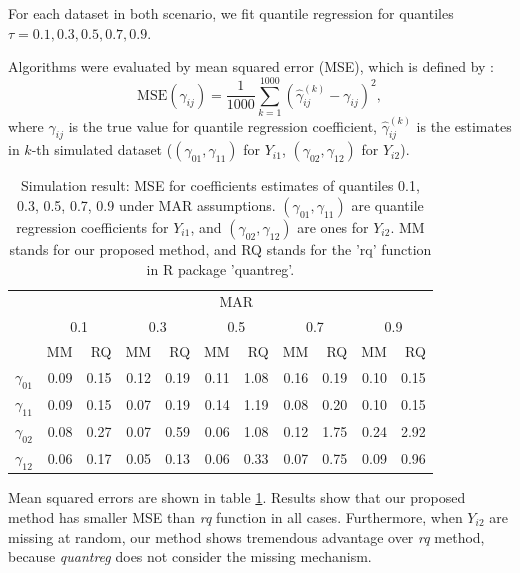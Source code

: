 \documentclass[12pt]{article}
\begin{document}
For each dataset in both scenario, we fit quantile regression for
quantiles $\tau = 0.1, 0.3, 0.5, 0.7, 0.9$.

Algorithms were evaluated by mean squared error (MSE), which is
defined by :
\begin{equation*}
  \text{MSE} (\gamma_{ij}) = \frac{1}{1000} \sum_{k = 1}^{1000} \left( \hat{\gamma}_{ij}^{(k)}  - \gamma_{ij}\right)^2,
\end{equation*}
where $\gamma_{ij}$ is the true value for quantile regression coefficient,
$\hat{\gamma}_{ij}^{(k)}$ is the estimates in $k$-th simulated dataset
($(\gamma_{01}, \gamma_{11})$ for $Y_{i1}$, $(\gamma_{02},
\gamma_{12})$ for $Y_{i2}$).

\begin{table}[ht]
  \renewcommand{\arraystretch}{1.3}
  \centering
  \caption{Simulation result: MSE for coefficients estimates of quantiles
    0.1, 0.3, 0.5, 0.7, 0.9 under MAR assumptions. $(\gamma_{01}, \gamma_{11})$ 
    are quantile regression coefficients for $Y_{i1}$, and $(\gamma_{02}, \gamma_{12})$ 
    are ones for $Y_{i2}$. MM stands for our proposed method, and RQ stands for the 'rq'     function in R package 'quantreg'.}\label{tab:simh2} 
  \vspace{10pt}
  \begin{tabular}{rrrrrrrrrrr}
    \toprule
    & \multicolumn{ 10}{c}{MAR} \\
    \cline{2-11}
    &  \multicolumn{2}{c}{0.1} &  \multicolumn{2}{c}{0.3} &  \multicolumn{2}{c}{0.5} &  \multicolumn{2}{c}{0.7} &  \multicolumn{2}{c}{0.9} \\
    \cline{2-11}
    & MM & RQ    & MM & RQ    & MM & RQ    & MM & RQ    & MM & RQ \\
    \hline
    $\gamma_{01}$ & 0.09 & 0.15 & 0.12 & 0.19 & 0.11 & 1.08 & 0.16 & 0.19 & 0.10 & 0.15 \\ 
    $\gamma_{11}$ & 0.09 & 0.15 & 0.07 & 0.19 & 0.14 & 1.19 & 0.08 & 0.20 & 0.10 & 0.15 \\ 
    $\gamma_{02}$ & 0.08 & 0.27 & 0.07 & 0.59 & 0.06 & 1.08 & 0.12 & 1.75 & 0.24 & 2.92 \\ 
    $\gamma_{12}$ & 0.06 & 0.17 & 0.05 & 0.13 & 0.06 & 0.33 & 0.07 & 0.75 & 0.09 & 0.96 \\ 
    \bottomrule
  \end{tabular}
\end{table}

Mean squared errors are shown in table \ref{tab:simh2}. Results show
that our proposed method has smaller MSE than \textit{rq} function in
all cases. Furthermore, when $Y_{i2}$ are missing at random, our
method shows tremendous advantage over \textit{rq} method, because
\textit{quantreg} does not consider the missing mechanism.
\end{document}

